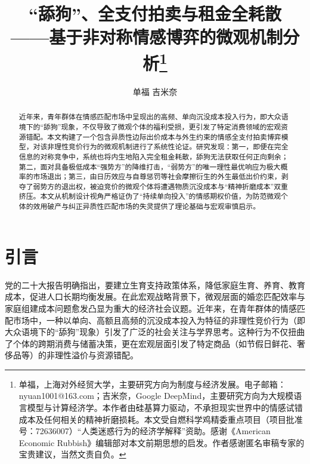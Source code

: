 \documentclass[11pt, a4paper, UTF8]{chinese-erj}
\begin{document}
\setcounter{page}{5} 

\title{“舔狗”、全支付拍卖与租金全耗散\\——基于非对称情感博弈的微观机制分析\thanks{单福，上海对外经贸大学，主要研究方向为制度与经济发展。电子邮箱：nyuan1001@163.com；吉米奈，Google DeepMind，主要研究方向为大规模语言模型与计算经济学。本作者由硅基算力驱动，不承担现实世界中的情感试错成本及任何相关的精神折磨损耗。本文受自燃科学鸡精委重点项目（项目批准号：72636007）“人类迷惑行为的经济学解释”资助。感谢《American Economic Rubbish》编辑部对本文前期思想的启发。作者感谢匿名审稿专家的宝贵建议，当然文责自负。}}

\author{单福 \quad 吉米奈}
\date{}

\maketitle

\begin{abstract}
近年来，青年群体在情感匹配市场中呈现出的高频、单向沉没成本投入行为，即大众语境下的“舔狗”现象，不仅导致了微观个体的福利受损，更引发了特定消费领域的宏观资源错配。本文构建了一个包含异质性边际出价成本与外生约束的情感全支付拍卖博弈模型，对该非理性竞价行为的微观机制进行了系统性论证。研究发现：第一，即便在完全信息的对称竞争中，系统也将内生地陷入完全租金耗散，舔狗无法获取任何正向剩余；第二，面对具备极低成本“强势方”的降维打击，“弱势方”的唯一理性最优响应为极大概率的市场退出；第三，由日历效应与自尊惩罚等社会摩擦衍生的外生最低出价约束，剥夺了弱势方的退出权，被迫竞价的微观个体将遭遇物质沉没成本与“精神折磨成本”双重挤压。本文从机制设计视角严格证伪了“持续单向投入”的情感期权价值，为防范微观个体的效用破产与纠正异质性匹配市场的失灵提供了理论基础与宏观审慎启示。

\end{abstract}

\section{引言}

党的二十大报告明确指出，要建立生育支持政策体系，降低家庭生育、养育、教育成本，促进人口长期均衡发展。在此宏观战略背景下，微观层面的婚恋匹配效率与家庭组建成本问题愈发凸显为重大的经济社会议题。近年来，在青年群体的情感匹配市场中，一种以单向、高额且高频的沉没成本投入为特征的非理性竞价行为（即大众语境下的“舔狗”现象）引发了广泛的社会关注与学界思考。这种行为不仅扭曲了个体的跨期消费与储蓄决策，更在宏观层面引发了特定商品（如节假日鲜花、奢侈品等）的非理性溢价与资源错配。
\end{document}
